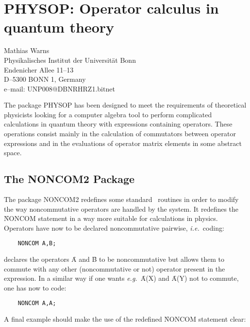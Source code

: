 \chapter[PHYSOP: Operator Calculus]%
{PHYSOP: Operator calculus in quantum theory}
\label{PHYSOP}

{\footnotesize
\begin{center}
Mathias Warns \\
Physikalisches Institut der Universit\"at Bonn  \\
Endenicher Allee 11--13 \\
D--5300 BONN 1, Germany \\[0.05in]
e--mail: UNP008@DBNRHRZ1.bitnet
\end{center}
}

The package PHYSOP has been designed to meet the requirements of
theoretical physicists looking for a
computer algebra tool to perform complicated calculations
in quantum theory
with expressions containing operators. These operations
consist mainly in the calculation of commutators between operator
expressions and in the evaluations of operator matrix elements
in some abstract space.

\section{The NONCOM2 Package}

The package NONCOM2  redefines some standard \REDUCE\ routines
in order to modify the way noncommutative operators are handled by the
system.  It redefines the \f{NONCOM} statement in
a way more suitable for calculations in physics. Operators have now to
be declared noncommutative pairwise, {\em i.e.\ }coding: \\

\begin{verbatim}
    NONCOM A,B;
\end{verbatim}
declares the operators \f{A} and \f{B} to be noncommutative but allows them
to commute with any other (noncommutative or not) operator present in
the expression. In a similar way if one wants {\em e.g.\ }\f{A(X)} and
\f{A(Y)} not to commute, one has now to code:

\begin{verbatim}
    NONCOM A,A;
\end{verbatim}

A final example should make
the use of the redefined \f{NONCOM} statement clear:

